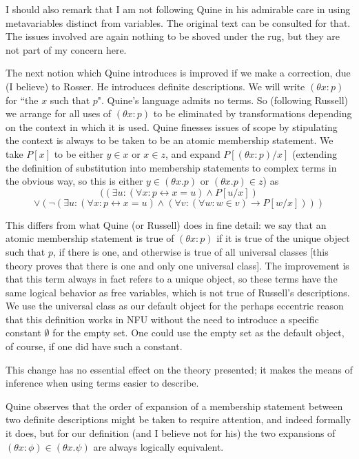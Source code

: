 \documentclass[12pt]{article}
\begin{document}
I should also remark that I am not following Quine in his admirable care in using metavariables distinct from variables.  The original text can be consulted for that.  The issues involved are again nothing to be shoved under the rug, but they are not part of my concern here.

The next notion which Quine introduces is improved if we make a correction, due (I believe) to Rosser.  He introduces definite descriptions.  We will write $(\theta x:p)$ for ``the $x$ such that $p$".  Quine's language admits no terms.  So (following Russell) we arrange for all uses of $(\theta x:p)$ to be eliminated by transformations depending on the context in which it is used.  Quine finesses issues of scope by stipulating the context is always to be taken to be an atomic membership statement.
We take $P[x]$ to be either $y \in x$ or $x \in z$, and expand $P[(\theta x:p)/x]$ (extending the definition of substitution into membership statements to complex terms in the obvious way, so this is either $y \in (\theta x.p)$ or $(\theta x.p) \in z$) as $$((\exists u:(\forall x:p \leftrightarrow x=u) \wedge P[u/x]) $$ $$\vee (\neg (\exists u:(\forall x:p \leftrightarrow x=u) \wedge (\forall v:(\forall w:w \in v)\rightarrow P[w/x])))$$

This differs from what Quine (or Russell) does in fine detail:  we say that an atomic membership statement is true of $(\theta x:p)$ if it is true of the unique object such that $p$, if there is one, and otherwise is true of all universal classes [this theory proves that there is one and only one universal class].  The improvement is that this term always in fact refers to a unique object, so these terms have the same logical behavior as free variables, which is not true of Russell's descriptions.  We use the universal class as our default object for the perhaps eccentric reason that this definition works in NFU without the need to introduce a specific constant $\emptyset$ for the empty set.  One could use the empty set as the default object, of course, if one did have such a constant.

This change has no essential effect on the theory presented;  it makes the means of inference when using terms easier to describe.

Quine observes that the order of expansion of a membership statement between two definite descriptions might be taken to require attention, and indeed formally it does, but for our definition (and I believe not for his) the two expansions of $(\theta x:\phi) \in (\theta x.\psi)$ are always logically equivalent.
\end{document}
